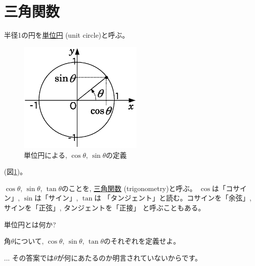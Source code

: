 \section{三角関数}

半径1の円を\underline{単位円} (unit circle)と呼ぶ。
\begin{figure}[h]
    \centering
    \includegraphics[width=6cm]{unit_circle.eps}
    \caption{単位円による, $\cos\theta$, $\sin \theta$の定義}\label{fig:unit_circle}
\end{figure}

(図\ref{fig:unit_circle})。

$\cos \theta$, $\sin \theta$, $\tan \theta$のことを, 
\underline{三角関数} 
(trigonometry)と呼ぶ。
$\cos$は「コサイン」, $\sin$は「サイン」, $\tan$は
「タンジェント」と読む。コサインを「余弦」, 
サインを「正弦」, タンジェントを「正接」
と呼ぶこともある。\mv

\begin{q}\label{q:trig_unitC} 単位円とは何か?\end{q}

\begin{q}\label{q:trig_sincos_def} 
角$\theta$について, $\cos \theta$, $\sin \theta$, $\tan \theta$のそれぞれを定義せよ。\end{q}

\begin{faq}{\small{}
... その答案では$\theta$が何にあたるのか明言されていないからです。}\end{faq}

